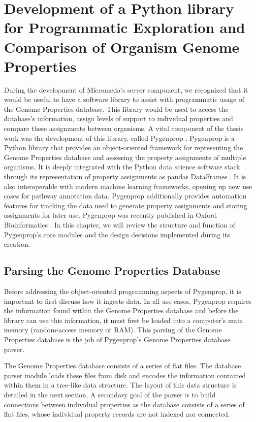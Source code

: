\chapter{Development of a Python library for Programmatic Exploration and Comparison of Organism Genome Properties} \label{Pygenprop}

During the development of Micromeda's server component, we recognized that it would be useful to have a software library to assist with programmatic usage of the Genome Properties database. This library would be used to access the database's information, assign levels of support to individual properties and compare these assignments between organisms. A vital component of the thesis work was the development of this library, called Pygenprop \cite{bergstrand2019pygenprop}. Pygenprop is a Python library that provides an object-oriented framework \cite{booch1986object} for representing the Genome Properties database and assessing the property assignments of multiple organisms. It is deeply integrated with the Python data science software stack \cite{scipystack} through its representation of property assignments as pandas DataFrames \cite{mckinney2010data}. It is also interoperable with modern machine learning frameworks, opening up new use cases for pathway annotation data. Pygenprop additionally provides automation features for tracking the data used to generate property assignments and storing assignments for later use. Pygenprop was recently published in Oxford Bioinformatics \cite{bergstrand2019pygenprop}. In this chapter, we will review the structure and function of Pygenprop's core modules and the design decisions implemented during its creation.

\section{Parsing the Genome Properties Database}

Before addressing the object-oriented programming aspects of Pygenprop, it is important to first discuss how it ingests data. In all use cases, Pygenprop requires the information found within the Genome Properties database and before the library can use this information, it must first be loaded into a computer's main memory (random-access memory or RAM). This parsing of the Genome Properties database is the job of Pygenprop's Genome Properties database parser.

The Genome Properties database consists of a series of flat files. The database parser module loads these files from disk and encodes the information contained within them in a tree-like data structure. The layout of this data structure is detailed in the next section. A secondary goal of the parser is to build connections between individual properties as the database consists of a series of flat files, whose individual property records are not indexed nor connected. 

